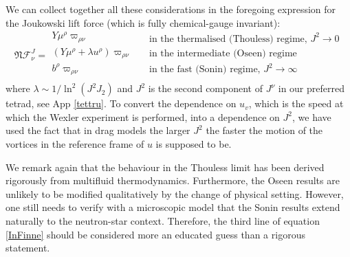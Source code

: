 \documentclass[preprints,article,accept,moreauthors,pdftex]{mdpi}
\begin{document}
We can collect together all these considerations in the foregoing expression for the Joukowski lift force (which is fully chemical-gauge invariant):
\begin{equation}\label{InFinne}
    \mathfrak{N} \mathcal{F}^J_\nu =
\begin{array}{l}
Y \mu^\rho \varpi_{\rho \nu}  \\
(Y \mu^\rho + \lambda u^\rho) \varpi_{\rho \nu} \\
b^\rho \varpi_{\rho \nu} \\
\end{array}
\quad
\begin{array}{l}
  \text{in the thermalised (Thouless) regime, } J^2 \rightarrow 0   \\
  \text{in the intermediate (Oseen) regime} \\
  \text{in the fast (Sonin) regime, } J^2  \rightarrow \infty \\
\end{array}
\end{equation}
where $\lambda \sim 1/\ln^{2}(J^2 J_2)$ and $J^2$ is the second component of $J^\nu$ in our preferred tetrad, see App \ref{tettru}. To convert the dependence on $u_v$, which is the speed at which the Wexler experiment is performed, into a dependence on $J^2$, we have used the fact that in drag models the larger $J^2$ the faster the motion of the vortices in the reference frame of $u$ is supposed to be.

We remark again that the behaviour in the Thouless limit has been derived rigorously from multifluid thermodynamics. Furthermore, the Oseen results are unlikely to be modified qualitatively by the change of physical setting. However, one still needs to verify with a microscopic model that the Sonin results extend naturally to the neutron-star context. Therefore, the third line of equation \eqref{InFinne} should be considered more an educated guess than a rigorous statement. 
\end{document}
